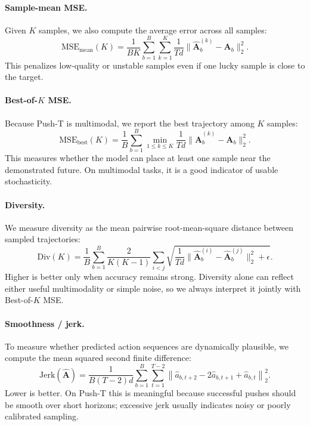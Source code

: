 \documentclass{article}
\begin{document}
\paragraph{Sample-mean MSE.}
Given $K$ samples, we also compute the average error across all samples:
\begin{equation}
\mathrm{MSE}_{\mathrm{mean}}(K)=\frac{1}{BK}\sum_{b=1}^{B}\sum_{k=1}^{K}
\frac{1}{Td}\lVert \hat{\mathbf{A}}^{(k)}_b-\mathbf{A}_b\rVert_2^2.
\end{equation}
This penalizes low-quality or unstable samples even if one lucky sample is close to the target.

\paragraph{Best-of-$K$ MSE.}
Because Push-T is multimodal, we report the best trajectory among $K$ samples:
\begin{equation}
\mathrm{MSE}_{\mathrm{best}}(K)=\frac{1}{B}\sum_{b=1}^{B} \min_{1\leq k\leq K}
\frac{1}{Td}\lVert \hat{\mathbf{A}}^{(k)}_b-\mathbf{A}_b\rVert_2^2.
\end{equation}
This measures whether the model can place at least one sample near the demonstrated future. On multimodal tasks, it is a good indicator of usable stochasticity.

\paragraph{Diversity.}
We measure diversity as the mean pairwise root-mean-square distance between sampled trajectories:
\begin{equation}
\mathrm{Div}(K)=\frac{1}{B}\sum_{b=1}^{B}\frac{2}{K(K-1)}\sum_{i<j}
\sqrt{\frac{1}{Td}\lVert \hat{\mathbf{A}}_b^{(i)}-\hat{\mathbf{A}}_b^{(j)}\rVert_2^2 + \epsilon}.
\end{equation}
Higher is better only when accuracy remains strong. Diversity alone can reflect either useful multimodality or simple noise, so we always interpret it jointly with Best-of-$K$ MSE.

\paragraph{Smoothness / jerk.}
To measure whether predicted action sequences are dynamically plausible, we compute the mean squared second finite difference:
\begin{equation}
\mathrm{Jerk}(\hat{\mathbf{A}})=\frac{1}{B(T-2)d}\sum_{b=1}^{B}\sum_{t=1}^{T-2}
\left\lVert \hat{a}_{b,t+2}-2\hat{a}_{b,t+1}+\hat{a}_{b,t}\right\rVert_2^2.
\end{equation}
Lower is better. On Push-T this is meaningful because successful pushes should be smooth over short horizons; excessive jerk usually indicates noisy or poorly calibrated sampling.
\end{document}
